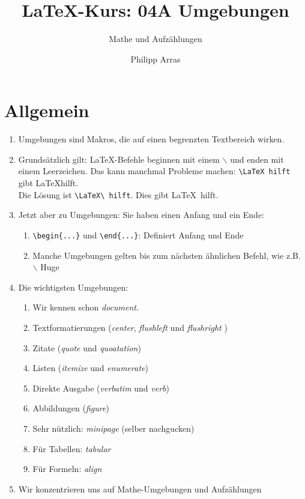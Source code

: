 \documentclass[11pt,a4paper]{scrartcl}
\author{Philipp Arras}
\title{\LaTeX -Kurs: 04A Umgebungen}
\subtitle{Mathe und Aufzählungen}
\begin{document}
\maketitle

\section{Allgemein}
\begin{enumerate}
\item Umgebungen sind Makros, die auf einen begrenzten Textbereich wirken.
\item Grundsätzlich gilt: \LaTeX -Befehle beginnen mit einem $\backslash$ und enden mit einem Leerzeichen. Das kann manchmal Probleme machen: \verb|\LaTeX hilft| gibt \LaTeX hilft.\\
Die Lösung ist \verb|\LaTeX\ hilft|. Dies gibt \LaTeX\ hilft.
\item Jetzt aber zu Umgebungen: Sie haben einen Anfang und ein Ende:
	\begin{enumerate}
	\item \verb|\begin{...}| und \verb|\end{...}|: Definiert Anfang und Ende
	\item Manche Umgebungen gelten bis zum nächsten ähnlichen Befehl, wie z.B. $\backslash$ Huge 
    
	\end{enumerate} 
\item Die wichtigsten Umgebungen:
  \begin{enumerate}
  \item Wir kennen schon \emph{document}.
  \item Textformatierungen (\emph{center}, \emph{flushleft} und \emph{flushright} )
  \item Zitate (\emph{quote} und \emph{quoatation})
  \item Listen (\emph{itemize} und \emph{enumerate})
  \item Direkte Ausgabe (\emph{verbatim} und \emph{verb})
  \item Abbildungen (\emph{figure})
  \item Sehr nützlich: \emph{minipage} (selber nachgucken)
  \item Für Tabellen: \emph{tabular} 
  \item Für Formeln: \emph{align} 
  \end{enumerate}
\item Wir konzentrieren uns auf Mathe-Umgebungen und Aufzählungen
\end{enumerate}
\end{document}
